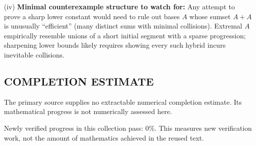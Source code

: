 (iv) \textbf{Minimal counterexample structure to watch for:} Any attempt to prove a sharp lower constant would need to rule out bases $A$ whose sumset $A+A$ is unusually ``efficient'' (many distinct sums with minimal collisions). Extremal $A$ empirically resemble unions of a short initial segment with a sparse progression; sharpening lower bounds likely requires showing every such hybrid incurs inevitable collisions.

\bigskip



\subsection*{COMPLETION ESTIMATE}
The primary source supplies no extractable numerical completion estimate. Its mathematical progress is not numerically assessed here.

Newly verified progress in this collection pass: $0\%$. This measures new verification work, not the amount of mathematics achieved in the reused text.
